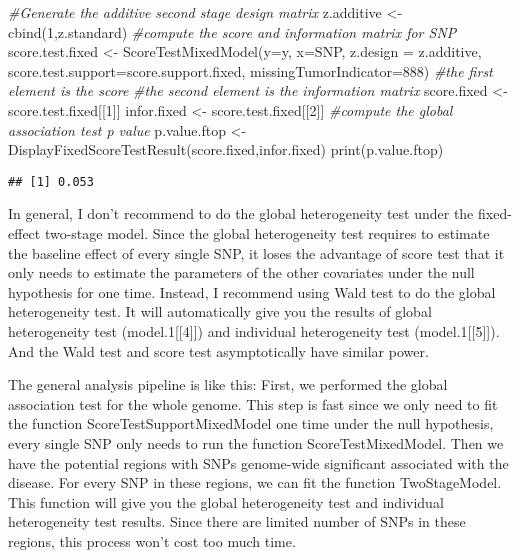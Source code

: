 \documentclass[11pt,]{article}
\newenvironment{Shaded}{\begin{snugshade}}{\end{snugshade}}
\newcommand{\AttributeTok}[1]{\textcolor[rgb]{0.77,0.63,0.00}{#1}}
\newcommand{\CommentTok}[1]{\textcolor[rgb]{0.56,0.35,0.01}{\textit{#1}}}
\newcommand{\DecValTok}[1]{\textcolor[rgb]{0.00,0.00,0.81}{#1}}
\newcommand{\FunctionTok}[1]{\textcolor[rgb]{0.00,0.00,0.00}{#1}}
\newcommand{\NormalTok}[1]{#1}
\newcommand{\OtherTok}[1]{\textcolor[rgb]{0.56,0.35,0.01}{#1}}
\begin{document}
\begin{Shaded}
\begin{Highlighting}[]
\CommentTok{\#Generate the additive second stage design matrix}
\NormalTok{z.additive }\OtherTok{\textless{}{-}} \FunctionTok{cbind}\NormalTok{(}\DecValTok{1}\NormalTok{,z.standard)}
\CommentTok{\#compute the score and information matrix for SNP}
\NormalTok{score.test.fixed }\OtherTok{\textless{}{-}} \FunctionTok{ScoreTestMixedModel}\NormalTok{(}\AttributeTok{y=}\NormalTok{y,}
                                        \AttributeTok{x=}\NormalTok{SNP,}
                                        \AttributeTok{z.design =}\NormalTok{ z.additive,}
                                        \AttributeTok{score.test.support=}\NormalTok{score.support.fixed,}
                                        \AttributeTok{missingTumorIndicator=}\DecValTok{888}\NormalTok{)}
\CommentTok{\#the first element is the score}
\CommentTok{\#the second element is the information matrix}
\NormalTok{score.fixed }\OtherTok{\textless{}{-}}\NormalTok{ score.test.fixed[[}\DecValTok{1}\NormalTok{]]}
\NormalTok{infor.fixed }\OtherTok{\textless{}{-}}\NormalTok{ score.test.fixed[[}\DecValTok{2}\NormalTok{]]}
\CommentTok{\#compute the global association test p value}
\NormalTok{p.value.ftop }\OtherTok{\textless{}{-}} \FunctionTok{DisplayFixedScoreTestResult}\NormalTok{(score.fixed,infor.fixed) }
\FunctionTok{print}\NormalTok{(p.value.ftop)}
\end{Highlighting}
\end{Shaded}

\begin{verbatim}
## [1] 0.053
\end{verbatim}

In general, I don't recommend to do the global heterogeneity test under
the fixed-effect two-stage model. Since the global heterogeneity test
requires to estimate the baseline effect of every single SNP, it loses
the advantage of score test that it only needs to estimate the
parameters of the other covariates under the null hypothesis for one
time. Instead, I recommend using Wald test to do the global
heterogeneity test. It will automatically give you the results of global
heterogeneity test (model.1{[}{[}4{]}{]}) and individual heterogeneity
test (model.1{[}{[}5{]}{]}). And the Wald test and score test
asymptotically have similar power.

The general analysis pipeline is like this: First, we performed the
global association test for the whole genome. This step is fast since we
only need to fit the function ScoreTestSupportMixedModel one time under
the null hypothesis, every single SNP only needs to run the function
ScoreTestMixedModel. Then we have the potential regions with SNPs
genome-wide significant associated with the disease. For every SNP in
these regions, we can fit the function TwoStageModel. This function will
give you the global heterogeneity test and individual heterogeneity test
results. Since there are limited number of SNPs in these regions, this
process won't cost too much time.
\end{document}

